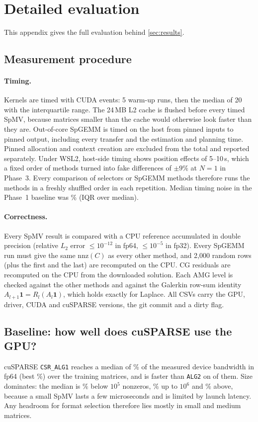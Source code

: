 \section{Detailed evaluation}\label{sec:eval}
This appendix gives the full evaluation behind \cref{sec:results}.

\subsection{Measurement procedure}
\paragraph{Timing.} Kernels are timed with CUDA events: 5 warm-up runs, then the median of 20 with the
interquartile range. The 24\,MB L2 cache is flushed before every timed SpMV, because matrices smaller than the cache
would otherwise look faster than they are. Out-of-core SpGEMM is timed on the host from pinned inputs to pinned output,
including every transfer and the estimation and planning time. Pinned allocation and context creation are excluded
from the total and reported separately. Under WSL2, host-side timing shows position effects of 5--10\,\textmu s, which
a fixed order of methods turned into fake differences of $\pm 9\%$ at $N=1$ in Phase~3. Every comparison of
selectors or SpGEMM methods therefore runs the methods in a freshly shuffled order in each repetition. Median timing
noise in the Phase~1 baseline was \% (IQR over median).

\paragraph{Correctness.} Every SpMV result is compared with a CPU reference accumulated in double precision
(relative $L_2$ error $\le 10^{-12}$ in fp64, $\le 10^{-5}$ in fp32). Every SpGEMM run must give the same
$\mathrm{nnz}(C)$ as every other method, and 2,000 random rows (plus the first and the last) are recomputed on the CPU.
CG residuals are recomputed on the CPU from the downloaded solution. Each AMG level is checked against the other
methods and against the Galerkin row-sum identity $A_{l+1}\mathbf 1 = R_l(A_l \mathbf 1)$, which holds exactly for
Laplace. All CSVs carry the GPU, driver, CUDA and cuSPARSE versions, the git commit and a dirty flag.

\subsection{Baseline: how well does cuSPARSE use the GPU?}
cuSPARSE \texttt{CSR\_ALG1} reaches a median of \% of the measured device bandwidth in
fp64 (best \%) over the  training matrices, and is faster than
\texttt{ALG2} on  of them. Size dominates: the median is \% below
$10^5$ nonzeros, \% up to $10^6$ and \% above, because a small SpMV
lasts a few microseconds and is limited by launch latency. Any headroom for format selection therefore lies mostly
in small and medium matrices.

